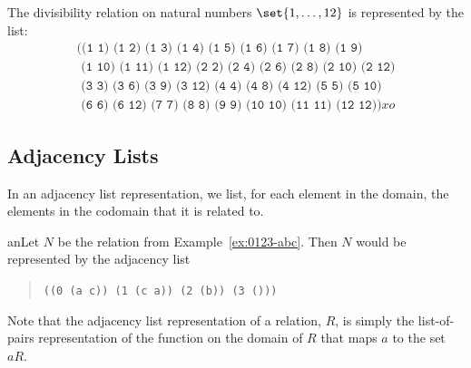 \begin{example}
The divisibility relation on natural numbers $\set{1,\dots,12}$ is
represented by the list:
\[\begin{array}{l}
\texttt{((1 1) (1 2) (1 3) (1 4) (1 5) (1 6) (1 7) (1 8) (1 9)}\\
\texttt{ (1 10) (1 11) (1 12) (2 2) (2 4) (2 6) (2 8) (2 10) (2 12)}\\
\texttt{ (3 3) (3 6) (3 9) (3 12) (4 4) (4 8) (4 12) (5 5) (5 10)}\\
\texttt{ (6 6) (6 12) (7 7) (8 8) (9 9) (10 10) (11 11) (12 12))}xo
\end{array}\]
\end{example}

\subsection{Adjacency Lists}

In an adjacency list representation, we list, for each element in the
domain, the elements in the codomain that it is related to.
\begin{example}
anLet $N$ be the relation from Example~\ref{ex:0123-abc}.
Then $N$ would be represented by the adjacency list
\begin{quote}
\texttt{((0 (a c)) (1 (c a)) (2 (b)) (3 ()))}
\end{quote}
\end{example}

Note that the adjacency list representation of a relation, $R$, is 
simply the list-of-pairs representation of the function on the domain of
$R$ that maps $a$ to the set $aR$.

